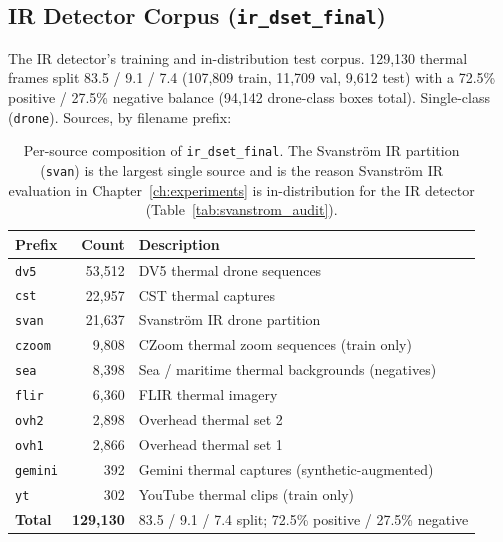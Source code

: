 \documentclass[12pt,a4paper,oneside,openright]{book}
\begin{document}
\subsection{IR Detector Corpus (\texttt{ir\_dset\_final})}
\label{sec:ds_ir}

The IR detector's training and in-distribution test corpus. 129{,}130 thermal frames split 83.5 / 9.1 / 7.4 (107{,}809 train, 11{,}709 val, 9{,}612 test) with a 72.5\% positive / 27.5\% negative balance (94{,}142 drone-class boxes total). Single-class (\texttt{drone}). Sources, by filename prefix:

\begin{table}[htbp]
    \centering
    \caption{Per-source composition of \texttt{ir\_dset\_final}. The Svanstr\"om IR partition (\texttt{svan}) is the largest single source and is the reason Svanstr\"om IR evaluation in Chapter~\ref{ch:experiments} is in-distribution for the IR detector (Table~\ref{tab:svanstrom_audit}).}
    \label{tab:ds_ir_components}
    \begin{tabular}{lrp{7.2cm}}
        \toprule
        Prefix & Count & Description \\
        \midrule
        \texttt{dv5}    & 53{,}512 & DV5 thermal drone sequences \\
        \texttt{cst}    & 22{,}957 & CST thermal captures \\
        \texttt{svan}   & 21{,}637 & Svanstr\"om IR drone partition \\
        \texttt{czoom}  &  9{,}808 & CZoom thermal zoom sequences (train only) \\
        \texttt{sea}    &  8{,}398 & Sea / maritime thermal backgrounds (negatives) \\
        \texttt{flir}   &  6{,}360 & FLIR thermal imagery \\
        \texttt{ovh2}   &  2{,}898 & Overhead thermal set 2 \\
        \texttt{ovh1}   &  2{,}866 & Overhead thermal set 1 \\
        \texttt{gemini} &     392 & Gemini thermal captures (synthetic-augmented) \\
        \texttt{yt}     &     302 & YouTube thermal clips (train only) \\
        \midrule
        \textbf{Total}  & \textbf{129{,}130} & 83.5 / 9.1 / 7.4 split; 72.5\% positive / 27.5\% negative \\
        \bottomrule
    \end{tabular}
\end{table}
\end{document}
